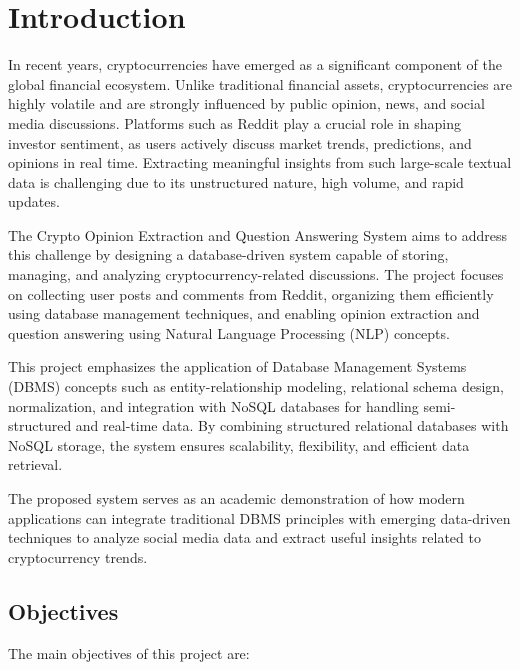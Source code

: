 
\chapter{Introduction}

In recent years, cryptocurrencies have emerged as a significant component of the global financial ecosystem. Unlike traditional financial assets, cryptocurrencies are highly volatile and are strongly influenced by public opinion, news, and social media discussions. Platforms such as Reddit play a crucial role in shaping investor sentiment, as users actively discuss market trends, predictions, and opinions in real time. Extracting meaningful insights from such large-scale textual data is challenging due to its unstructured nature, high volume, and rapid updates.

The Crypto Opinion Extraction and Question Answering System aims to address this challenge by designing a database-driven system capable of storing, managing, and analyzing cryptocurrency-related discussions. The project focuses on collecting user posts and comments from Reddit, organizing them efficiently using database management techniques, and enabling opinion extraction and question answering using Natural Language Processing (NLP) concepts.

This project emphasizes the application of Database Management Systems (DBMS) concepts such as entity-relationship modeling, relational schema design, normalization, and integration with NoSQL databases for handling semi-structured and real-time data. By combining structured relational databases with NoSQL storage, the system ensures scalability, flexibility, and efficient data retrieval.

The proposed system serves as an academic demonstration of how modern applications can integrate traditional DBMS principles with emerging data-driven techniques to analyze social media data and extract useful insights related to cryptocurrency trends.

\section{Objectives}

The main objectives of this project are:

